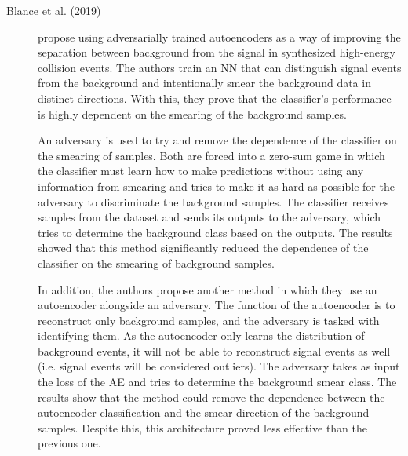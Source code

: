 \begin{description}
    \item[Blance et al. (2019) \cite{blance.etal_AdversariallytrainedAutoencodersRobust_2019}] propose using adversarially trained autoencoders as a way of improving the separation between background from the signal in synthesized high-energy collision events. The authors train an NN that can distinguish signal events from the background and intentionally smear the background data in distinct directions. With this, they prove that the classifier's performance is highly dependent on the smearing of the background samples.

    An adversary is used to try and remove the dependence of the classifier on the smearing of samples. Both are forced into a zero-sum game in which the classifier must learn how to make predictions without using any information from smearing and tries to make it as hard as possible for the adversary to discriminate the background samples. The classifier receives samples from the dataset and sends its outputs to the adversary, which tries to determine the background class based on the outputs. The results showed that this method significantly reduced the dependence of the classifier on the smearing of background samples.

    In addition, the authors propose another method in which they use an autoencoder alongside an adversary. The function of the autoencoder is to reconstruct only background samples, and the adversary is tasked with identifying them. As the autoencoder only learns the distribution of background events, it will not be able to reconstruct signal events as well (i.e. signal events will be considered outliers). The adversary takes as input the loss of the AE and tries to determine the background smear class. The results show that the method could remove the dependence between the autoencoder classification and the smear direction of the background samples. Despite this, this architecture proved less effective than the previous one.
\end{description}

